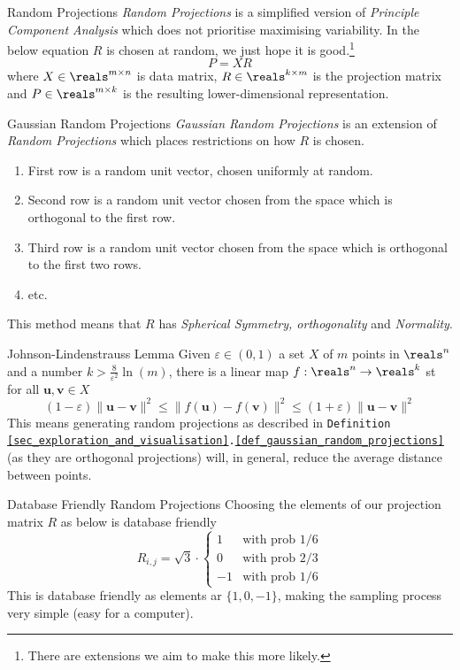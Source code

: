 \documentclass[11pt,a4paper]{article}
\begin{document}
  \begin{definition}{Random Projections}
    \textit{Random Projections} is a simplified version of \textit{Principle Component Analysis} which does not prioritise maximising variability. In the below equation $R$ is chosen at random, we just hope it is good.\footnote{There are extensions we aim to make this more likely.}
    \[ P=XR\]
    where $X\in\reals^{m\times n}$ is data matrix, $R\in\reals^{k\times m}$ is the projection matrix and $P\in\reals^{m\times k}$ is the resulting lower-dimensional representation.
  \end{definition}

  \begin{definition}{Gaussian Random Projections}\label{def_gaussian_random_projections}
    \textit{Gaussian Random Projections} is an extension of \textit{Random Projections} which places restrictions on how $R$ is chosen.
    \begin{enumerate}
      \item First row is a random unit vector, chosen uniformly at random.
      \item Second row is a random unit vector chosen from the space which is orthogonal to the first row.
      \item Third row is a random unit vector chosen from the space which is orthogonal to the first two rows.
      \item etc.
    \end{enumerate}
    This method means that $R$ has \textit{Spherical Symmetry, orthogonality} and \textit{Normality}.
  \end{definition}

  \begin{theorem}{Johnson-Lindenstrauss Lemma}
    Given $\varepsilon\in(0,1)$ a set $X$ of $m$ points in $\reals^n$ and a number $k>\frac8{\varepsilon^2}\ln(m)$, there is a linear map $f:\reals^n\to\reals^k$ st for all $\mathbf{u},\mathbf{v}\in X$
    \[ (1-\varepsilon)\|\mathbf{u}-\mathbf{v}\|^2\leq\|f(\mathbf{u})-f(\mathbf{v})\|^2\leq(1+\varepsilon)\|\mathbf{u}-\mathbf{v}\|^2 \]
    This means generating random projections as described in \texttt{Definition \ref{sec_exploration_and_visualisation}.\ref{def_gaussian_random_projections}} (as they are orthogonal projections) will, in general, reduce the average distance between points.
  \end{theorem}

  \begin{remark}{Database Friendly Random Projections}
    Choosing the elements of our projection matrix $R$ as below is database friendly
    \[ R_{i,j}=\sqrt3\cdot\begin{cases}1&\text{with prob }1/6\\0&\text{with prob }2/3\\-1&\text{with prob }1/6\end{cases} \]
    This is database friendly as elements ar $\{1,0,-1\}$, making the sampling process very simple (easy for a computer).
  \end{remark}
\end{document}

